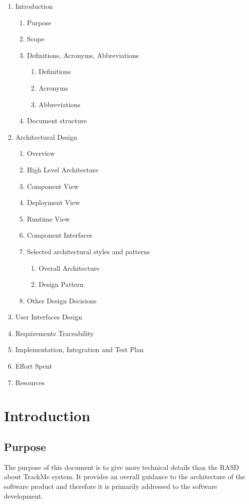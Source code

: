 \documentclass{article}
\begin{document}
	\begin{enumerate}
			\item Introduction
			\begin{enumerate}
				\item Purpose
				\item Scope
				\item Definitions, Acronyms, Abbreviations
				\begin{enumerate}
					\item Definitions
					\item Acronyms
					\item Abbreviations
				\end{enumerate}
				\item Document structure
			\end{enumerate}
			\item Architectural Design
			\begin{enumerate}
				\item Overview
				\item High Level Architecture
				\item Component View
				\item Deployment View
				\item Runtime View
				\item Component Interfaces
				\item Selected architectural styles and patterns
				\begin{enumerate}
				\item Overall Architecture
				\item Design Pattern
				\end{enumerate}
				\item Other Design Decisions
			\end{enumerate}
			\item User Interfaces Design
			\item Requirements Traceability
			\item Implementation, Integration and Test Plan
			\item Effort Spent
			\item Resources
	\end{enumerate}
	\newpage
\section{Introduction}
\subsection{Purpose}
The purpose of this document is to give more technical details than the RASD about TrackMe system.
It provides an overall guidance to the architecture of the software product and therefore it is primarily addressed to the software development.
\end{document}
